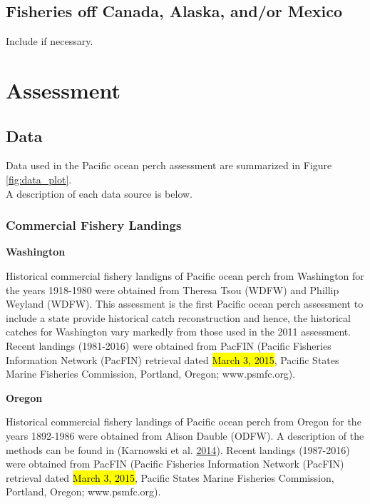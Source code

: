 \documentclass[12pt,]{article}
\begin{document}
\subsection{Fisheries off Canada, Alaska, and/or
Mexico}\label{fisheries-off-canada-alaska-andor-mexico}

Include if necessary.

\section{Assessment}\label{assessment}

\subsection{Data}\label{data}

Data used in the Pacific ocean perch assessment are summarized in Figure
\ref{fig:data_plot}.\\
A description of each data source is below.

\subsubsection{Commercial Fishery
Landings}\label{commercial-fishery-landings}

\textbf{Washington}

Historical commercial fishery landigns of Pacific ocean perch from
Washington for the years 1918-1980 were obtained from Theresa Tsou
(WDFW) and Phillip Weyland (WDFW). This assessment is the first Pacific
ocean perch assessment to include a state provide historical catch
reconstruction and hence, the historical catches for Washington vary
markedly from those used in the 2011 assessment. Recent landings
(1981-2016) were obtained from PacFIN (Pacific Fisheries Information
Network (PacFIN) retrieval dated \hl{March 3, 2015}, Pacific States
Marine Fisheries Commission, Portland, Oregon; www.psmfc.org).

\textbf{Oregon}

Historical commercial fishery landings of Pacific ocean perch from
Oregon for the years 1892-1986 were obtained from Alison Dauble (ODFW).
A description of the methods can be found in (Karnowski et al.
\protect\hyperlink{ref-karnowski_historical_2014}{2014}). Recent
landings (1987-2016) were obtained from PacFIN (Pacific Fisheries
Information Network (PacFIN) retrieval dated \hl{March 3, 2015}, Pacific
States Marine Fisheries Commission, Portland, Oregon; www.psmfc.org).
\end{document}
